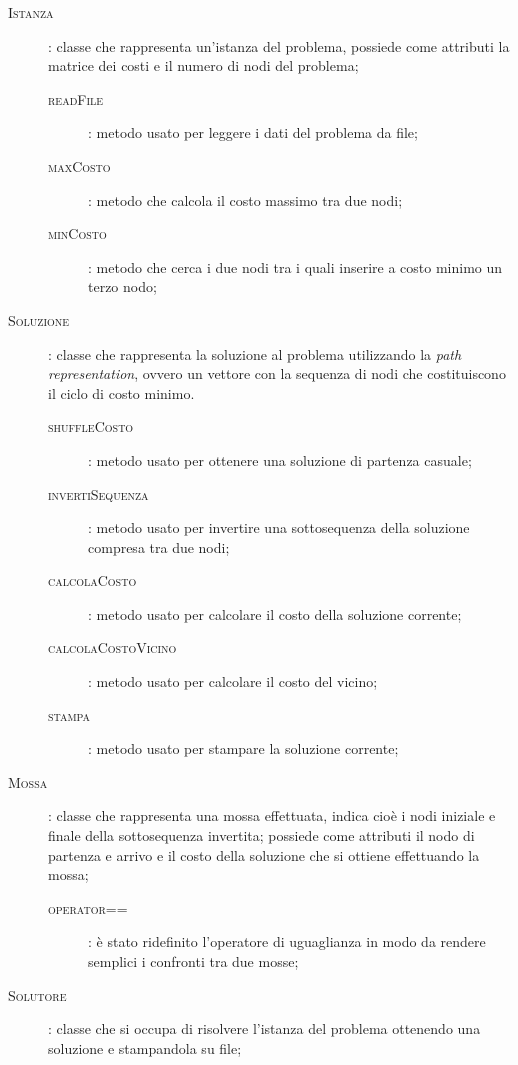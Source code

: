 \begin{description}
	\item[\textsc{Istanza}]: classe che rappresenta un'istanza del problema, possiede come attributi la matrice dei costi e il numero di nodi del problema;
	\begin{description}
		\item[\textsc{readFile}]: metodo usato per leggere i dati del problema da file;
		\item[\textsc{maxCosto}]: metodo che calcola il costo massimo tra due nodi;
		\item[\textsc{minCosto}]: metodo che cerca i due nodi tra i quali inserire a costo minimo un terzo nodo;
	\end{description}
	\item[\textsc{Soluzione}]: classe che rappresenta la soluzione al problema utilizzando la \emph{path representation}, ovvero un vettore con la sequenza di nodi che costituiscono il ciclo di costo minimo.
	\begin{description}
		\item[\textsc{shuffleCosto}]: metodo usato per ottenere una soluzione di partenza casuale;
		\item[\textsc{invertiSequenza}]: metodo usato per invertire una sottosequenza della soluzione compresa tra due nodi;
		\item[\textsc{calcolaCosto}]: metodo usato per calcolare il costo della soluzione corrente;
		\item[\textsc{calcolaCostoVicino}]: metodo usato per calcolare il costo del vicino;
		\item[\textsc{stampa}]: metodo usato per stampare la soluzione corrente;
	\end{description}
	\item[\textsc{Mossa}]: classe che rappresenta una mossa effettuata, indica cioè i nodi iniziale e finale della sottosequenza invertita; possiede come attributi il nodo di partenza e arrivo e il costo della soluzione che si ottiene effettuando la mossa;
	\begin{description}
		\item[\textsc{operator==}]: è stato ridefinito l'operatore di uguaglianza in modo da rendere semplici i confronti tra due mosse;
	\end{description}
	\item[\textsc{Solutore}]: classe che si occupa di risolvere l'istanza del problema ottenendo una soluzione e stampandola su file;
	\begin{description}

\end{description}
\end{description}
